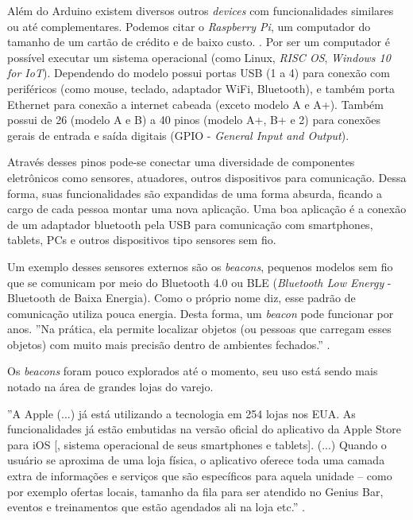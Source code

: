 Além do Arduino existem diversos outros \textit{devices} com funcionalidades similares ou até complementares. Podemos citar o \textit{Raspberry Pi}, um computador do tamanho de um cartão de crédito e de baixo custo. \cite{raspberrypi-rpi}. Por ser um computador é possível executar um sistema operacional (como Linux, \textit{RISC OS}, \textit{Windows 10 for IoT}). Dependendo do modelo possui portas USB (1 a 4) para conexão com periféricos (como mouse, teclado, adaptador WiFi, Bluetooth), e também porta Ethernet para conexão a internet cabeada (exceto modelo A e A+). Também possui de 26 (modelo A e B) a 40 pinos (modelo A+, B+ e 2) para conexões gerais de entrada e saída digitais (GPIO - \textit{General Input and Output}). 

Através desses pinos pode-se conectar uma diversidade de componentes eletrônicos como sensores, atuadores, outros dispositivos para comunicação. Dessa forma, suas funcionalidades são expandidas de uma forma absurda, ficando a cargo de cada pessoa montar uma nova aplicação. Uma boa aplicação é a conexão de um adaptador bluetooth pela USB para comunicação com smartphones, tablets, PCs e outros dispositivos tipo sensores sem fio.

Um exemplo desses sensores externos são os \textit{beacons}, pequenos modelos sem fio que se comunicam por meio do Bluetooth 4.0 ou BLE (\textit{Bluetooth Low Energy} - Bluetooth de Baixa Energia). Como o próprio nome diz, esse padrão de comunicação utiliza pouca energia. Desta forma, um \textit{beacon} pode funcionar por anos. ''Na prática, ela permite localizar objetos (ou pessoas que carregam esses objetos) com muito mais precisão dentro de ambientes fechados.'' \cite{teixeira-beacon}.

Os \textit{beacons} foram pouco explorados até o momento, seu uso está sendo mais notado na área de grandes lojas do varejo.

\begin{citacao}
''A Apple (...) já está utilizando a tecnologia em 254 lojas nos EUA. As funcionalidades já estão embutidas na versão oficial do aplicativo da Apple Store para iOS [, sistema operacional de seus smartphones e tablets]. (...) Quando o usuário se aproxima de uma loja física, o aplicativo oferece toda uma camada extra de informações e serviços que são específicos para aquela unidade – como por exemplo ofertas locais, tamanho da fila para ser atendido no Genius Bar, eventos e treinamentos que estão agendados ali na loja etc.'' \cite{teixeira-beacon}.
\end{citacao}

